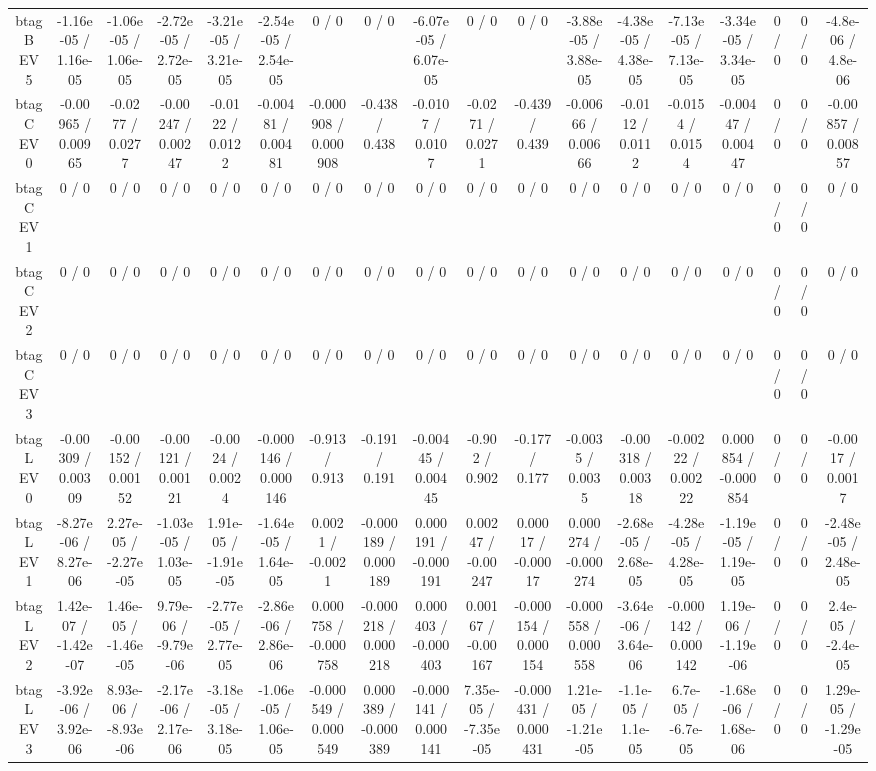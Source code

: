 \documentclass[10pt]{article}
\begin{document}
\begin{table}[htbp]
\begin{center}
\begin{tabular}{|c|c|c|c|c|c|c|c|c|c|c|c|c|c|c|c|c|c|}
  btag B EV 5 & -1.16e-05 / 1.16e-05 & -1.06e-05 / 1.06e-05 & -2.72e-05 / 2.72e-05 & -3.21e-05 / 3.21e-05 & -2.54e-05 / 2.54e-05 & 0 / 0 & 0 / 0 & -6.07e-05 / 6.07e-05 & 0 / 0 & 0 / 0 & -3.88e-05 / 3.88e-05 & -4.38e-05 / 4.38e-05 & -7.13e-05 / 7.13e-05 & -3.34e-05 / 3.34e-05 & 0 / 0 & 0 / 0 & -4.8e-06 / 4.8e-06 \\ 
  btag C EV 0 & -0.00965 / 0.00965 & -0.0277 / 0.0277 & -0.00247 / 0.00247 & -0.0122 / 0.0122 & -0.00481 / 0.00481 & -0.000908 / 0.000908 & -0.438 / 0.438 & -0.0107 / 0.0107 & -0.0271 / 0.0271 & -0.439 / 0.439 & -0.00666 / 0.00666 & -0.0112 / 0.0112 & -0.0154 / 0.0154 & -0.00447 / 0.00447 & 0 / 0 & 0 / 0 & -0.00857 / 0.00857 \\ 
  btag C EV 1 & 0 / 0 & 0 / 0 & 0 / 0 & 0 / 0 & 0 / 0 & 0 / 0 & 0 / 0 & 0 / 0 & 0 / 0 & 0 / 0 & 0 / 0 & 0 / 0 & 0 / 0 & 0 / 0 & 0 / 0 & 0 / 0 & 0 / 0 \\ 
  btag C EV 2 & 0 / 0 & 0 / 0 & 0 / 0 & 0 / 0 & 0 / 0 & 0 / 0 & 0 / 0 & 0 / 0 & 0 / 0 & 0 / 0 & 0 / 0 & 0 / 0 & 0 / 0 & 0 / 0 & 0 / 0 & 0 / 0 & 0 / 0 \\ 
  btag C EV 3 & 0 / 0 & 0 / 0 & 0 / 0 & 0 / 0 & 0 / 0 & 0 / 0 & 0 / 0 & 0 / 0 & 0 / 0 & 0 / 0 & 0 / 0 & 0 / 0 & 0 / 0 & 0 / 0 & 0 / 0 & 0 / 0 & 0 / 0 \\ 
  btag L EV 0 & -0.00309 / 0.00309 & -0.00152 / 0.00152 & -0.00121 / 0.00121 & -0.0024 / 0.0024 & -0.000146 / 0.000146 & -0.913 / 0.913 & -0.191 / 0.191 & -0.00445 / 0.00445 & -0.902 / 0.902 & -0.177 / 0.177 & -0.0035 / 0.0035 & -0.00318 / 0.00318 & -0.00222 / 0.00222 & 0.000854 / -0.000854 & 0 / 0 & 0 / 0 & -0.0017 / 0.0017 \\ 
  btag L EV 1 & -8.27e-06 / 8.27e-06 & 2.27e-05 / -2.27e-05 & -1.03e-05 / 1.03e-05 & 1.91e-05 / -1.91e-05 & -1.64e-05 / 1.64e-05 & 0.0021 / -0.0021 & -0.000189 / 0.000189 & 0.000191 / -0.000191 & 0.00247 / -0.00247 & 0.00017 / -0.00017 & 0.000274 / -0.000274 & -2.68e-05 / 2.68e-05 & -4.28e-05 / 4.28e-05 & -1.19e-05 / 1.19e-05 & 0 / 0 & 0 / 0 & -2.48e-05 / 2.48e-05 \\ 
  btag L EV 2 & 1.42e-07 / -1.42e-07 & 1.46e-05 / -1.46e-05 & 9.79e-06 / -9.79e-06 & -2.77e-05 / 2.77e-05 & -2.86e-06 / 2.86e-06 & 0.000758 / -0.000758 & -0.000218 / 0.000218 & 0.000403 / -0.000403 & 0.00167 / -0.00167 & -0.000154 / 0.000154 & -0.000558 / 0.000558 & -3.64e-06 / 3.64e-06 & -0.000142 / 0.000142 & 1.19e-06 / -1.19e-06 & 0 / 0 & 0 / 0 & 2.4e-05 / -2.4e-05 \\ 
  btag L EV 3 & -3.92e-06 / 3.92e-06 & 8.93e-06 / -8.93e-06 & -2.17e-06 / 2.17e-06 & -3.18e-05 / 3.18e-05 & -1.06e-05 / 1.06e-05 & -0.000549 / 0.000549 & 0.000389 / -0.000389 & -0.000141 / 0.000141 & 7.35e-05 / -7.35e-05 & -0.000431 / 0.000431 & 1.21e-05 / -1.21e-05 & -1.1e-05 / 1.1e-05 & 6.7e-05 / -6.7e-05 & -1.68e-06 / 1.68e-06 & 0 / 0 & 0 / 0 & 1.29e-05 / -1.29e-05 \\ 

\end{tabular}
\end{center}
\end{table}
\end{document}
